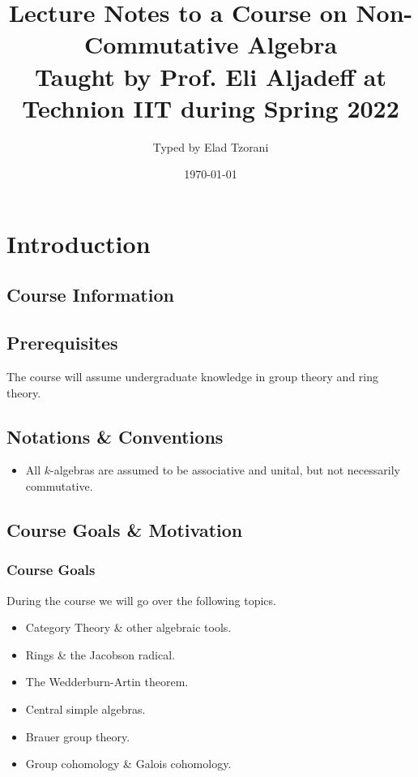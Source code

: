 \documentclass[11pt]{kbook}
\title{Lecture Notes to a Course on Non-Commutative Algebra \\ \small{Taught by Prof. Eli Aljadeff at Technion IIT during Spring 2022}}
\author{Typed by Elad Tzorani}
\date{\today}
\begin{document}
\maketitle


\chapter*{Introduction}

\section*{Course Information}


\section*{Prerequisites}

The course will assume undergraduate knowledge in group theory and ring theory.

\section*{Notations \& Conventions}


\begin{itemize}
\item All $k$-algebras are assumed to be associative and unital, but not necessarily commutative.
\end{itemize}

\section*{Course Goals \& Motivation}

\subsection*{Course Goals}

During the course we will go over the following topics.

\begin{itemize}
\item Category Theory \& other algebraic tools.

\item Rings \& the Jacobson radical.

\item The Wedderburn-Artin theorem.

\item Central simple algebras.

\item Brauer group theory.

\item Group cohomology \& Galois cohomology.

\end{itemize}
\end{document}
